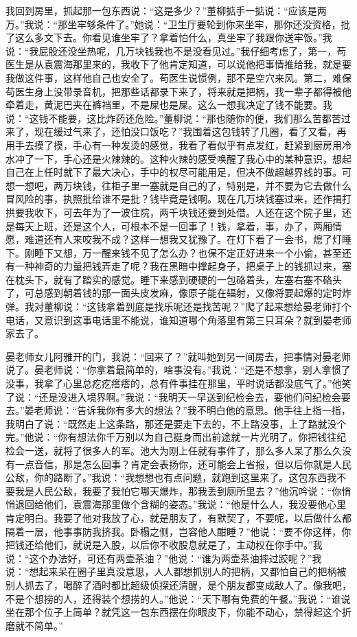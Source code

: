 \documentclass[12pt,oneside]{book}
\begin{document}
我回到房里，抓起那一包东西说：``这是多少？''董柳掂手一掂说：``应该是两万。''我说：``那坐牢够条件了。''她说：``卫生厅要轮到你来坐牢，那你还没资格，批了这么多文下去。你看见谁坐牢了？拿着怕什么，真坐牢了我跟你送牢饭。''我说：``我屁股还没坐热呢，几万块钱我也不是没看见过。''我仔细考虑了，第一，苟医生是从袁震海那里来的，我收下了他肯定知道，可以说他把事情推给我，就是要我做这件事，这样他自己也安全了。苟医生说惯例，那不是空穴来风。第二，难保苟医生身上没带录音机，把那些话都录下来了，将来就是把柄，我一辈子都得被他牵着走，黄泥巴夹在裤裆里，不是屎也是屎。这么一想我决定了钱不能要。我说：``这钱不能要，这比炸药还危险。''董柳说：``那也随你的便，我们那么苦都苦过来了，现在缓过气来了，还怕没口饭吃？''我围着这包钱转了几圈，看了又看，再用手去摸了摸，手心有一种发烫的感觉，我看了看似乎有点发红，赶紧到厨房用冷水冲了一下，手心还是火辣辣的。这种火辣的感受唤醒了我心中的某种意识，想起自己在上任时就下了最大决心，手中的权尽可能用足，但决不做超越界线的事。可想一想吧，两万块钱，往柜子里一塞就是自己的了，特别是，并不要为它去做什么冒风险的事，执照批给谁不是批？钱毕竟是钱啊。现在几万块钱塞过来，还作揖打拱要我收下，可去年为了一波住院，两千块钱还要到处借。人还在这个院子里，还是每天上班，还是这个人，可根本不是一回事了！钱，拿着，事，办了，两厢情愿，难道还有人来咬我不成？这样一想我又犹豫了。在灯下看了一会书，熄了灯睡下。刚睡下又想，万一醒来钱不见了怎么办？也保不定正好进来一个小偷，甚至还有一种神奇的力量把钱弄走了呢？我在黑暗中撑起身子，把桌子上的钱抓过来，塞在枕头下，就有了踏实的感觉。睡下来感到硬硬的一包硌着头，左塞右塞不硌头了，可总感到朝着钱的那一面头皮发麻，像原子能在辐射，又像将要起爆的定时炸弹。我对董柳说：``这钱拿着到底是找乐呢还是找苦呢？''爬了起来想给晏老师打个电话，又意识到这事电话里不能说，谁知道哪个角落里有第三只耳朵？就到晏老师家去了。

晏老师女儿阿雅开的门，我说：``回来了？''就叫她到另一间房去，把事情对晏老师说了。晏老师说：``你拿着最简单的，啥事没有。''我说：``还是不想拿，别人拿惯了没事，我拿了心里总疙疙瘩瘩的，总有件事挂在那里，平时说话都没底气了。''他笑了说：``还是没进入境界啊。''我说：``我明天一早送到纪检会去，要他们问纪检会要去。''晏老师说：``告诉我你有多大的想法？''我不明白他的意思。他手往上指一指，我明白了说：``既然走上这条路，那还是要走下去的，不上路没事，上了路就没个完。''他说：``你有想法你千万别以为自己挺身而出前途就一片光明了。你把钱往纪检会一送，就将了很多人的军。池大为刚上任就有事件了，那么多人呆了那么久没有一点音信，那是怎么回事？肯定会表扬你，还可能会上省报，但以后你就是人民公敌，你的路断了。''我说：``我想想也有点问题，就跑到这里来了。这包东西我不要我是人民公敌，我要了我怕它哪天爆炸，那我丢到厕所里去？''他沉吟说：``你悄悄退回给他们，袁震海那里做个含糊的姿态。''我说：``他是什么人，我没要他心里肯定明白。我要了他对我放了心，就是朋友了，有默契了，不要呢，以后做什么都隔着一层，他事事防我挤我。卧榻之侧，岂容他人酣睡？''他说：``要不你这样，你把钱还给他们，就说是入股，以后你不收股息就是了，主动权在你手中。''我说：``这个办法好，可还有两壶茶油？''他说：``谁为两壶茶油摔过跤呢？''我说：``想起来呆在圈子里真没意思，人人都想抓别人的把柄，又都怕自己的把柄被别人抓去了，喝醉了酒时都比超级侦探还清醒，是个朋友都变成敌人了。像我吧，不是个想捞的人，还得装个想捞的人。''他说：``天下哪有免费的午餐。''我说：``谁说坐在那个位子上简单？就凭这一包东西摆在你眼皮下，你能不动心，禁得起这个折磨就不简单。''
\end{document}
